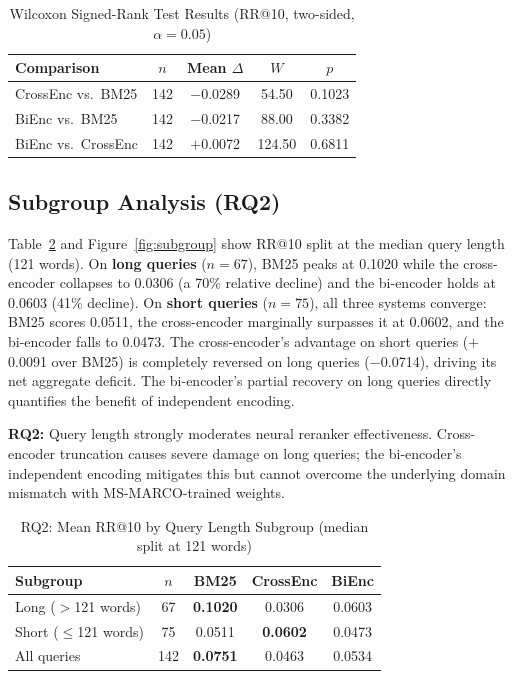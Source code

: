 \documentclass[conference]{IEEEtran}
\begin{document}
\begin{table}[t]
\caption{Wilcoxon Signed-Rank Test Results (RR@10, two-sided, $\alpha=0.05$)}
\label{tab:wilcoxon}
\centering
\begin{tabular}{lcccc}
\toprule
Comparison & $n$ & Mean $\Delta$ & $W$ & $p$ \\
\midrule
CrossEnc vs.\ BM25   & 142 & $-$0.0289 &  54.50 & 0.1023 \\
BiEnc vs.\ BM25      & 142 & $-$0.0217 &  88.00 & 0.3382 \\
BiEnc vs.\ CrossEnc  & 142 & $+$0.0072 & 124.50 & 0.6811 \\
\bottomrule
\end{tabular}
\end{table}

\subsection{Subgroup Analysis (RQ2)}

Table~\ref{tab:rq2} and Figure~\ref{fig:subgroup} show RR@10 split at the
median query length (121 words).
On \textbf{long queries} ($n=67$), BM25 peaks at 0.1020 while the cross-encoder
collapses to 0.0306 (a 70\% relative decline) and the bi-encoder holds at 0.0603
(41\% decline).
On \textbf{short queries} ($n=75$), all three systems converge:
BM25 scores 0.0511, the cross-encoder marginally surpasses it at 0.0602,
and the bi-encoder falls to 0.0473.
The cross-encoder's advantage on short queries ($+$0.0091 over BM25) is completely
reversed on long queries ($-$0.0714), driving its net aggregate deficit.
The bi-encoder's partial recovery on long queries directly quantifies the benefit
of independent encoding.

\textbf{RQ2:} Query length strongly moderates neural reranker effectiveness.
Cross-encoder truncation causes severe damage on long queries; the bi-encoder's
independent encoding mitigates this but cannot overcome the underlying domain
mismatch with MS-MARCO-trained weights.

\begin{table}[t]
\caption{RQ2: Mean RR@10 by Query Length Subgroup (median split at 121 words)}
\label{tab:rq2}
\centering
\begin{tabular}{lcccc}
\toprule
Subgroup & $n$ & BM25 & CrossEnc & BiEnc \\
\midrule
Long ($>$121 words)     & 67  & \textbf{0.1020} & 0.0306 & 0.0603 \\
Short ($\leq$121 words) & 75  & 0.0511 & \textbf{0.0602} & 0.0473 \\
\midrule
All queries             & 142 & \textbf{0.0751} & 0.0463 & 0.0534 \\
\bottomrule
\end{tabular}
\end{table}
\end{document}
